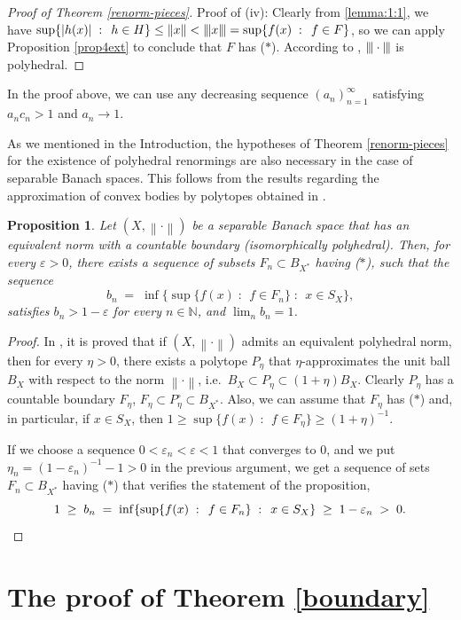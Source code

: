 \documentclass[12pt,a4paper]{amsart}
\newtheorem{proposition}[theorem]{Proposition}
\theoremstyle{definition}
\theoremstyle{remark}
\newcommand{\eps}{\ensuremath{\varepsilon}}
\newcommand{\n}[1]{\ensuremath{\left\|{#1}\right\|}}
\newcommand{\N}{\mathbb{N}}
\newcommand{\ndot}{\ensuremath{\left\|\cdot\right\|}}
\newcommand{\set}[2]{\{{#1} \;:\;\, {#2}\}}
\newcommand{\st}{($*$)}
\newcommand{\tri}{{\displaystyle |\kern-.9pt|\kern-.9pt|}}
\newcommand{\tn}[1]{\ensuremath{\tri{#1}\tri}}
\newcommand{\tndot}{\ensuremath{\tri\cdot\tri}}
\begin{document}
\begin{proof}[Proof of Theorem \ref{renorm-pieces}]
Proof of (iv): Clearly from \eqref{lemma:1:1}, we have $\sup\set{|h(x)|}{h \in H} \leq \n{x}
< \tn{x}=\sup\set{f(x)}{f \in F}$, so we can apply Proposition
\ref{prop4ext} to conclude that $F$ has {\st}. According to \cite[Proposition 6.11]{FLP},
$\tndot$ is polyhedral.
\qedhere
\end{proof}

In the proof above, we can use any decreasing sequence
$(a_n)_{n=1}^\infty$ satisfying $a_n c_n > 1$ and $a_n \to 1$.

As we mentioned in the Introduction, the hypotheses of Theorem \ref{renorm-pieces}
for the existence of polyhedral renormings are also necessary in the
case of separable Banach spaces. This follows from the results regarding
the approximation of convex bodies by polytopes obtained in \cite{DFH}.

\begin{proposition}\label{nec-condition}
Let $(X,\ndot)$ be a separable Banach space that has an equivalent norm with a
countable boundary (isomorphically polyhedral). Then, for every $\eps >0$, there exists a
sequence of subsets $F_n\subset B_{X^*}$ having {\st}, such that
the sequence
\[
b_n \;=\; \inf \set{\sup\set{f(x)}{f \in F_n}}{x \in S_X},
\]
satisfies $b_n>1-\eps$ for every $n\in\N$, and $\lim_n b_n=1$.
\end{proposition}

\begin{proof}
In \cite[Theorem 1.1]{DFH}, it is proved that if $(X,\ndot)$ admits an equivalent
polyhedral norm, then for every $\eta >0$, there exists a polytope $P_\eta$ that
$\eta$-approximates the unit ball $B_X$ with respect to the norm $\ndot$, i.e.\
$B_X\subset P_\eta \subset (1+\eta)B_X$. Clearly $P_{\eta}$ has a countable boundary $F_\eta$,
$F_\eta \subset P_\eta^\circ \subset B_{X^*}$. Also, we can assume that $F_\eta$
has {\st} and, in particular, if $x\in S_X$, then $1\geq \sup\set{f(x)}{f \in F_\eta}\geq (1+\eta)^{-1}$.

If we choose a sequence $0<\eps_n<\eps<1$ that converges to 0, and we
 put $\eta_n = (1-\eps_n)^{-1}-1 >0$ in the
previous argument,  we get a sequence of sets $F_n\subset B_{X^*}$ having {\st} that
verifies the statement of the proposition,
\[
1\;\geq\; b_n \;=\; \inf\set{\sup\set{f(x)}{f \in F_n}}{x \in S_X} \;\geq\; 1-\eps_n\;>\;0. \qedhere
\]
\end{proof}

\section{The proof of Theorem \ref{boundary}}\label{boundary-proof}
\end{document}

